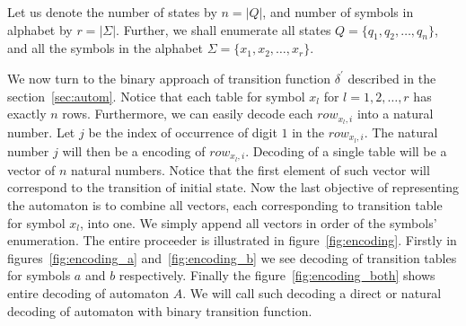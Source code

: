 \documentclass[runningheads,a4paper]{llncs}
\begin{document}
Let us denote the number of states by $n = |Q|$, and number of symbols in alphabet by $r = |\Sigma|$. Further, we shall enumerate all states 	$Q = \{q_1, q_2, \ldots, q_n\}$, and all the symbols in the alphabet 	$\Sigma = \{x_1, x_2, \ldots, x_r\}$.

We now turn to the binary approach of transition function $\delta^{'}$ described in the section~\ref{sec:autom}. Notice that each table for symbol $x_l$ for $l = 1,2, \dots, r$ has exactly $n$ rows. Furthermore, we can easily decode each $row_{x_l, i}$ into a natural number. Let $j$ be the index of occurrence of digit $1$ in the $row_{x_l, i}$. The natural number $j$ will then be a encoding of $row_{x_l, i}$. Decoding of a single table will be a vector of $n$ natural numbers. Notice that the first element of such vector will correspond to the transition of initial state. Now the last objective of representing the automaton is to combine all vectors, each corresponding to transition table for symbol $x_{l}$, into one. We simply append all vectors in order of the symbols' enumeration. The entire proceeder is illustrated in figure~\ref{fig:encoding}. Firstly in figures~\ref{fig:encoding_a} and~\ref{fig:encoding_b} we see decoding of transition tables for symbols $a$ and $b$ respectively. Finally the figure~\ref{fig:encoding_both} shows entire decoding of automaton $A$. We will call such decoding a direct or natural decoding of automaton with binary transition function.
\end{document}
